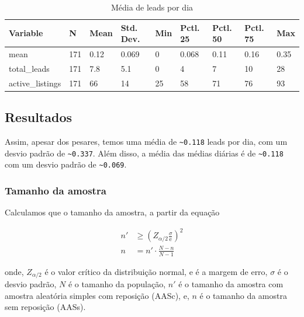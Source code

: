 \documentclass[
]{article}
\begin{document}
\begin{table}

\caption{\label{tab:unnamed-chunk-11}Média de leads por dia}
\centering
\begin{tabular}[t]{lllllllll}
\toprule
Variable & N & Mean & Std. Dev. & Min & Pctl. 25 & Pctl. 50 & Pctl. 75 & Max\\
\midrule
mean & 171 & 0.12 & 0.069 & 0 & 0.068 & 0.11 & 0.16 & 0.35\\
total\_leads & 171 & 7.8 & 5.1 & 0 & 4 & 7 & 10 & 28\\
active\_listings & 171 & 66 & 14 & 25 & 58 & 71 & 76 & 93\\
\bottomrule
\end{tabular}
\end{table}

\subsection{Resultados}\label{resultados}

Assim, apesar dos pesares, temos uma média de
\texttt{\textasciitilde{}0.118} leads por dia, com um desvio padrão de
\texttt{\textasciitilde{}0.337}. Além disso, a média das médias diárias
é de \texttt{\textasciitilde{}0.118} com um desvio padrão de
\texttt{\textasciitilde{}0.069}.

\subsubsection{Tamanho da amostra}\label{tamanho-da-amostra}

Calculamos que o tamanho da amostra, a partir da equação

\[
\begin{aligned}
n' &\ge \left(Z_{\alpha / 2} \frac{\sigma}{\text{e}}\right)^2 \\
n  &= n' \cdot \frac{N-n}{N-1}
\end{aligned}
\]

onde, \(Z_{\alpha / 2}\) é o valor crítico da distribuição normal,
\(\text{e}\) é a margem de erro, \(\sigma\) é o desvio padrão, \(N\) é o
tamanho da população, \(n'\) é o tamanho da amostra com amostra
aleatória simples com reposição (AASc), e, \(n\) é o tamanho da amostra
sem reposição (AASs).
\end{document}
